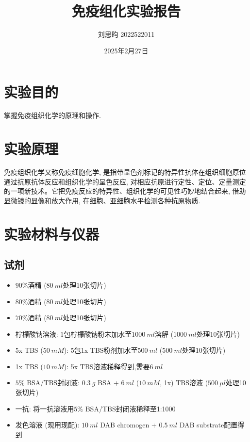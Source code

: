 \documentclass{article}
\title{免疫组化实验报告}
\author{刘思昀 2022522011}
\date{2025年2月27日}
\begin{document}
\maketitle

\section{实验目的}

掌握免疫组织化学的原理和操作.

\section{实验原理}

免疫组织化学又称免疫细胞化学, 是指带显色剂标记的特异性抗体在组织细胞原位通过抗原抗体反应和组织化学的呈色反应, 对相应抗原进行定性、定位、定量测定的一项新技术。它把免疫反应的特异性、组织化学的可见性巧妙地结合起来, 借助显微镜的显像和放大作用, 在细胞、亚细胞水平检测各种抗原物质.

\section{实验材料与仪器}

\subsection{试剂}

\begin{itemize}
    \item $90\%$酒精 ($80\ ml$处理10张切片)
    \item $80\%$酒精 ($80\ ml$处理10张切片)
    \item $70\%$酒精 ($80\ ml$处理10张切片)
    \item 柠檬酸钠溶液: 1包柠檬酸钠粉末加水至$1000\ ml$溶解 ($1000\ ml$处理10张切片)
    \item 5x TBS ($50\ mM$): 5包1x TBS粉剂加水至$500\ ml$ ($500\ ml$处理10张切片)
    \item 1x TBS ($10\ mM$): 5x TBS溶液稀释得到,需要$6\ ml$
    \item $5\%$ BSA/TBS封闭液: $0.3\ g$ BSA + $6\ ml$ ($10\ mM$, 1x) TBS溶液 ($500\ \mu l$处理10张切片)
    \item 一抗: 将一抗溶液用$5\%$ BSA/TBS封闭液稀释至1:1000
    \item 发色溶液 (现用现配): $10\ ml$ DAB chromogen + $0.5\ ml$ DAB substrate配置得到
\end{itemize}
\end{document}
